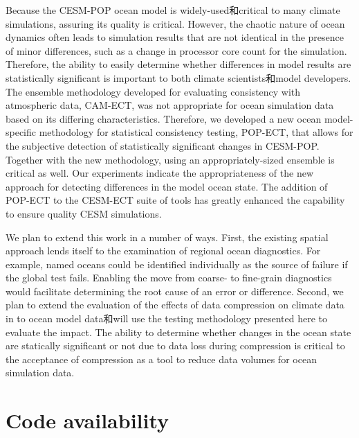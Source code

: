 Because the CESM-POP ocean model is widely-used和critical to many climate simulations, assuring its quality is critical. However, the chaotic nature of ocean dynamics often leads to simulation results that are not identical in the presence of minor differences, such as a change in processor core count for the simulation.  Therefore, the ability to easily determine whether differences in model results are statistically significant is important to both climate scientists和model developers.  The ensemble methodology developed for evaluating consistency with atmospheric data, CAM-ECT, was not appropriate for ocean simulation data based on its differing characteristics.  Therefore, we developed a new ocean model-specific methodology for statistical consistency testing, POP-ECT, that allows for the subjective detection of statistically significant changes in CESM-POP.  Together with the new methodology, using an appropriately-sized ensemble is critical as well. Our experiments indicate the appropriateness of the new approach for detecting differences in the model ocean state. The addition of POP-ECT to the CESM-ECT suite of tools has greatly enhanced the capability to ensure quality CESM simulations.

We plan to extend this work in a number of ways.  First, the existing spatial approach lends itself to the examination of regional ocean diagnostics.  For example, named oceans could be identified individually as the source of failure if the global test fails.  Enabling the move from coarse- to fine-grain diagnostics would facilitate determining the root cause of an error or difference.  Second, we plan to extend the evaluation of the effects of data compression on climate data in \cite{baker2014} to ocean model data和will use the testing methodology presented here to evaluate the impact. The ability to determine whether changes in the ocean state are statically significant or not due to data loss during compression is critical to the acceptance of compression as a tool to reduce data volumes for ocean simulation data.



  \section{Code availability}\label{sec:code}

